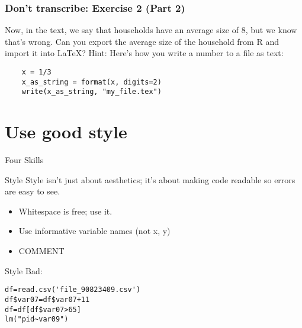 \documentclass[11pt]{beamer}
\begin{document}
\begin{frame}[c, fragile]{Don't transcribe results: Exercise 3}
Make tables:
\begin{verbatim}
stargazer(list(model1, model2, model3, model4),
          title="TITLE HERE",
          type="latex",
          out='FILE_NAME.tex' )
\end{verbatim}
\hline
\begin{verbatim}
eststo clear
eststo: reg polity gdp_per_cap
eststo: reg polity gdp_per_cap under5_mortality
esttab using your_file_name.tex, replace ///
       title("My regressions!")
\end{verbatim}
\hline
Latex Import: \texttt{\\{your\_file\_name.tex\}}
\end{frame}


\begin{frame}[fragile]\frametitle{Don't transcribe: Exercise 2 (Part 2)}
Now, in the text, we say that households have an average size of 8, but we know that's wrong. Can you export the average size of the household from R and import it into LaTeX? Hint: Here's how you write a number to a file as text:

\begin{verbatim}
    x = 1/3
    x_as_string = format(x, digits=2)
    write(x_as_string, "my_file.tex")
\end{verbatim}
\end{frame}



\section{Use good style}
\begin{frame}[c]{Four Skills}
    \tableofcontents[currentsection]
\end{frame}

\begin{frame}[c]{Style}
Style isn't just about aesthetics; it's about making code \alert{readable} so errors are easy to see.
\begin{itemize}
    \item Whitespace is free; use it.
    \item Use informative variable names (not x, y)
    \item COMMENT
\end{itemize}
\end{frame}

\begin{frame}[c, fragile]{Style}
Bad:
\begin{verbatim}
df=read.csv('file_90823409.csv')
df$var07=df$var07+11
df=df[df$var07>65]
lm("pid~var09")
\end{verbatim}
\end{frame}
\end{document}
